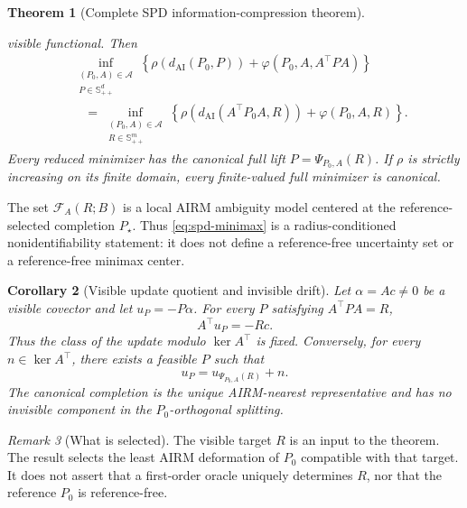 \documentclass[10pt]{article}
\theoremstyle{plain}
\newtheorem{theorem}{Theorem}[section]
\newtheorem{corollary}[theorem]{Corollary}
\theoremstyle{definition}
\theoremstyle{remark}
\newtheorem{remark}[theorem]{Remark}
\newcommand{\R}{\mathbb R}
\newcommand{\SPD}{\mathbb S_{++}}
\newcommand{\AI}{\mathrm{AI}}
\newcommand{\dai}{d_{\AI}}
\begin{document}
\begin{theorem}[Complete SPD information-compression theorem]
\begin{enumerate}[label=(\Alph*),leftmargin=*]
  visible functional.  Then
  \begin{align}
    &\inf_{\substack{(P_0,A)\in\mathcal A\\P\in\SPD^d}}
    \left\{\rho(\dai(P_0,P))+\varphi(P_0,A,A^\top PA)\right\}
    \nonumber\\
    &\quad=
    \inf_{\substack{(P_0,A)\in\mathcal A\\R\in\SPD^m}}
    \left\{\rho(\dai(A^\top P_0A,R))+\varphi(P_0,A,R)\right\}.
    \label{eq:spd-decision-reduction}
  \end{align}
  Every reduced minimizer has the canonical full lift
  \(P=\Psi_{P_0,A}(R)\).  If \(\rho\) is strictly increasing on its finite
  domain, every finite-valued full minimizer is canonical.
\end{enumerate}
\end{theorem}

The set \(\mathcal F_A(R;B)\) is a local AIRM ambiguity model centered at
the reference-selected completion \(P_\star\).  Thus
\eqref{eq:spd-minimax} is a radius-conditioned nonidentifiability statement:
it does not define a reference-free uncertainty set or a reference-free
minimax center.

\begin{corollary}[Visible update quotient and invisible drift]
\label{cor:visible-update}
Let \(\alpha=Ac\ne0\) be a visible covector and let
\(u_P=-P\alpha\).  For every \(P\) satisfying \(A^\top PA=R\),
\begin{equation}
  A^\top u_P=-Rc.
  \label{eq:visible-update-quotient}
\end{equation}
Thus the class of the update modulo \(\ker A^\top\) is fixed.  Conversely,
for every \(n\in\ker A^\top\), there exists a feasible \(P\) such that
\begin{equation}
  u_P=u_{\Psi_{P_0,A}(R)}+n.
  \label{eq:arbitrary-invisible-drift}
\end{equation}
The canonical completion is the unique AIRM-nearest representative and has no
invisible component in the \(P_0\)-orthogonal splitting.
\end{corollary}

\begin{remark}[What is selected]
The visible target \(R\) is an input to the theorem.  The result selects the
least AIRM deformation of \(P_0\) compatible with that target.  It does not
assert that a first-order oracle uniquely determines \(R\), nor that the
reference \(P_0\) is reference-free.
\end{remark}
\end{document}
